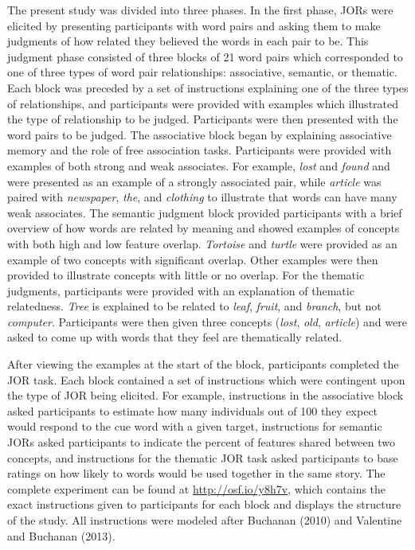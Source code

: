 \documentclass[english,man]{apa6}
\theoremstyle{definition}
\theoremstyle{definition}
\theoremstyle{definition}
\theoremstyle{remark}
\begin{document}
The present study was divided into three phases. In the first phase,
JORs were elicited by presenting participants with word pairs and asking
them to make judgments of how related they believed the words in each
pair to be. This judgment phase consisted of three blocks of 21 word
pairs which corresponded to one of three types of word pair
relationships: associative, semantic, or thematic. Each block was
preceded by a set of instructions explaining one of the three types of
relationships, and participants were provided with examples which
illustrated the type of relationship to be judged. Participants were
then presented with the word pairs to be judged. The associative block
began by explaining associative memory and the role of free association
tasks. Participants were provided with examples of both strong and weak
associates. For example, \emph{lost} and \emph{found} and were presented
as an example of a strongly associated pair, while \emph{article} was
paired with \emph{newspaper}, \emph{the}, and \emph{clothing} to
illustrate that words can have many weak associates. The semantic
judgment block provided participants with a brief overview of how words
are related by meaning and showed examples of concepts with both high
and low feature overlap. \emph{Tortoise} and \emph{turtle} were provided
as an example of two concepts with significant overlap. Other examples
were then provided to illustrate concepts with little or no overlap. For
the thematic judgments, participants were provided with an explanation
of thematic relatedness. \emph{Tree} is explained to be related to
\emph{leaf}, \emph{fruit}, and \emph{branch}, but not \emph{computer}.
Participants were then given three concepts (\emph{lost}, \emph{old},
\emph{article}) and were asked to come up with words that they feel are
thematically related.

After viewing the examples at the start of the block, participants
completed the JOR task. Each block contained a set of instructions which
were contingent upon the type of JOR being elicited. For example,
instructions in the associative block asked participants to estimate how
many individuals out of 100 they expect would respond to the cue word
with a given target, instructions for semantic JORs asked participants
to indicate the percent of features shared between two concepts, and
instructions for the thematic JOR task asked participants to base
ratings on how likely to words would be used together in the same story.
The complete experiment can be found at \url{http://osf.io/y8h7v}, which
contains the exact instructions given to participants for each block and
displays the structure of the study. All instructions were modeled after
Buchanan (2010) and Valentine and Buchanan (2013).
\end{document}
